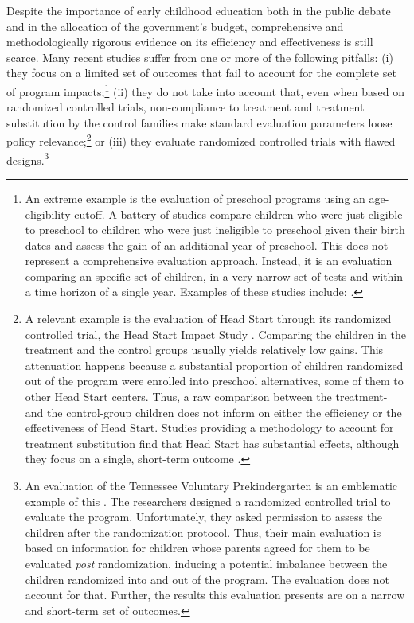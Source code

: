 \noindent Despite the importance of early childhood education both in the public debate and in the allocation of the government's budget, comprehensive and methodologically rigorous evidence on its efficiency and effectiveness  is still scarce. Many recent studies suffer from one or more of the following pitfalls: (i) they focus on a limited set of outcomes that fail to account for the complete set of program impacts;\footnote{An extreme example is the evaluation of preschool programs using an age-eligibility cutoff. A battery of studies compare children who were just eligible to preschool to children who were just ineligible to preschool given their birth dates and assess the gain of an additional year of preschool. This does not represent a comprehensive evaluation approach. Instead, it is an evaluation comparing an specific set of children, in a very narrow set of tests and within a time horizon of a single year. Examples of these studies include: \citet{Gormley_Gayer_2005_JHR,Gormley_Gayer_etal_2005_DP,Weiland_2013_CD_Impacts-of-Pre-K}.} (ii) they do not take into account that, even when based on randomized controlled trials, non-compliance to treatment and treatment substitution by the control families make standard evaluation parameters loose policy relevance;\footnote{A relevant example is the evaluation of Head Start through its randomized controlled trial, the Head Start Impact Study \citep{Puma_Bell_etal_2010_HeadStartImpact}. Comparing the children in the treatment and the control groups usually yields relatively low gains. This attenuation happens because a substantial proportion of children randomized out of the program were enrolled into preschool alternatives, some of them to other Head Start centers. Thus, a raw comparison between the treatment- and the control-group children does not inform on either the efficiency or the effectiveness of Head Start. Studies providing a methodology to account for treatment substitution find that Head Start has substantial effects, although they focus on a single, short-term outcome \citep{Kline-Walters_2015_NBER-Evaluating,Feller_Grindal_etal_2016_ComparedtoWhat}.} or (iii) they evaluate randomized controlled trials with flawed designs.\footnote{An evaluation of the Tennessee Voluntary Prekindergarten is an emblematic example of this \citep{Lipsey_et_al_2013_Tennessee_Kindergrtn_PRI,Lipsey_et_al_2015_Randomized_Control_Trial_PRI}. The researchers designed a randomized controlled trial to evaluate the program. Unfortunately, they asked permission to assess the children after the randomization protocol. Thus, their main evaluation is based on information for children whose parents agreed for them to be evaluated \textit{post} randomization, inducing a potential imbalance between the children randomized into and out of the program. The evaluation does not account for that. Further, the results this evaluation presents are on a narrow and short-term set of outcomes.}\\ 

